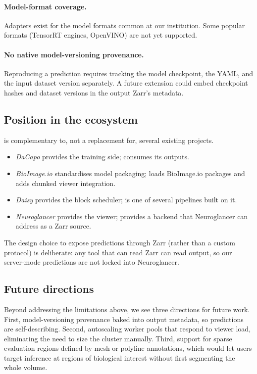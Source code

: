 \paragraph{Model-format coverage.} Adapters exist for the model formats common at our institution. Some popular formats (TensorRT engines, OpenVINO) are not yet supported.

\paragraph{No native model-versioning provenance.} Reproducing a prediction requires tracking the model checkpoint, the YAML, and the input dataset version separately. A future extension could embed checkpoint hashes and dataset versions in the output Zarr's metadata.

\subsection*{Position in the ecosystem}

\cellmapflow{} is complementary to, not a replacement for, several existing projects.

\begin{itemize}
\item \emph{DaCapo} \cite{Patton2024} provides the training side; \cellmapflow{} consumes its outputs.
\item \emph{BioImage.io} \cite{BioImageIO} standardises model packaging; \cellmapflow{} loads BioImage.io packages and adds chunked viewer integration.
\item \emph{Daisy} \cite{DaisyFunke} provides the block scheduler; \cellmapflow{} is one of several pipelines built on it.
\item \emph{Neuroglancer} \cite{Neuroglancer} provides the viewer; \cellmapflow{} provides a backend that Neuroglancer can address as a Zarr source.
\end{itemize}

The design choice to expose predictions through Zarr (rather than a custom protocol) is deliberate: any tool that can read Zarr can read \cellmapflow{} output, so our server-mode predictions are not locked into Neuroglancer.

\subsection*{Future directions}

Beyond addressing the limitations above, we see three directions for future work. First, model-versioning provenance baked into output metadata, so predictions are self-describing. Second, autoscaling worker pools that respond to viewer load, eliminating the need to size the cluster manually. Third, support for sparse evaluation regions defined by mesh or polyline annotations, which would let users target inference at regions of biological interest without first segmenting the whole volume.

